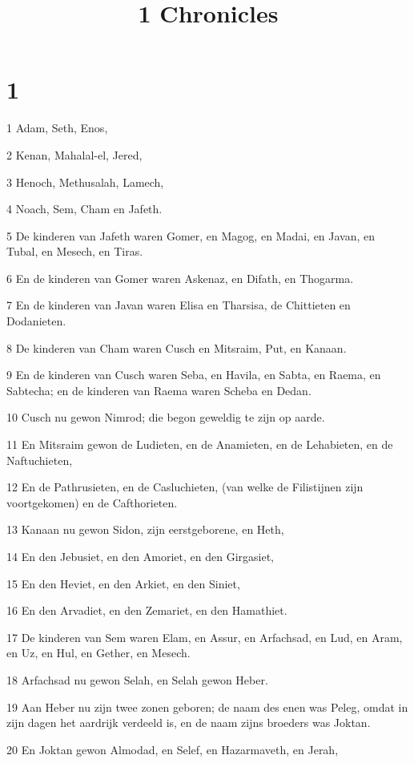 

\title{1 Chronicles}



\chapter{1}

\par 1 Adam, Seth, Enos,
\par 2 Kenan, Mahalal-el, Jered,
\par 3 Henoch, Methusalah, Lamech,
\par 4 Noach, Sem, Cham en Jafeth.
\par 5 De kinderen van Jafeth waren Gomer, en Magog, en Madai, en Javan, en Tubal, en Mesech, en Tiras.
\par 6 En de kinderen van Gomer waren Askenaz, en Difath, en Thogarma.
\par 7 En de kinderen van Javan waren Elisa en Tharsisa, de Chittieten en Dodanieten.
\par 8 De kinderen van Cham waren Cusch en Mitsraim, Put, en Kanaan.
\par 9 En de kinderen van Cusch waren Seba, en Havila, en Sabta, en Raema, en Sabtecha; en de kinderen van Raema waren Scheba en Dedan.
\par 10 Cusch nu gewon Nimrod; die begon geweldig te zijn op aarde.
\par 11 En Mitsraim gewon de Ludieten, en de Anamieten, en de Lehabieten, en de Naftuchieten,
\par 12 En de Pathrusieten, en de Casluchieten, (van welke de Filistijnen zijn voortgekomen) en de Cafthorieten.
\par 13 Kanaan nu gewon Sidon, zijn eerstgeborene, en Heth,
\par 14 En den Jebusiet, en den Amoriet, en den Girgasiet,
\par 15 En den Heviet, en den Arkiet, en den Siniet,
\par 16 En den Arvadiet, en den Zemariet, en den Hamathiet.
\par 17 De kinderen van Sem waren Elam, en Assur, en Arfachsad, en Lud, en Aram, en Uz, en Hul, en Gether, en Mesech.
\par 18 Arfachsad nu gewon Selah, en Selah gewon Heber.
\par 19 Aan Heber nu zijn twee zonen geboren; de naam des enen was Peleg, omdat in zijn dagen het aardrijk verdeeld is, en de naam zijns broeders was Joktan.
\par 20 En Joktan gewon Almodad, en Selef, en Hazarmaveth, en Jerah,
